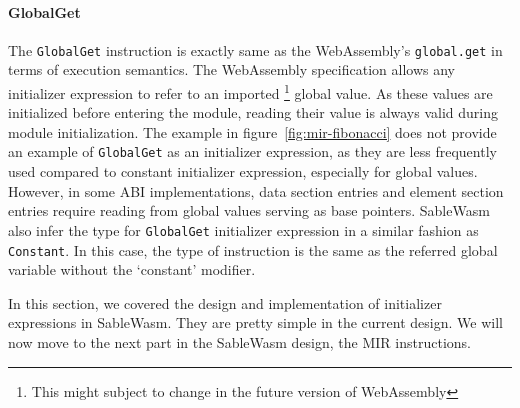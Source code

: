 \paragraph{GlobalGet}
The \texttt{GlobalGet} instruction is exactly same as the WebAssembly's
\texttt{global.get} in terms of execution semantics. The WebAssembly
specification allows any initializer expression to refer to an imported
\footnote{This might subject to change in the future version of WebAssembly}
global value. As these values are initialized before entering the module,
reading their value is always valid during module initialization. The example
in figure~\ref{fig:mir-fibonacci} does not provide an example of
\texttt{GlobalGet} as an initializer expression, as they are less frequently
used compared to constant initializer expression, especially for global values.
However, in some ABI implementations, data section entries and element section
entries require reading from global values serving as base pointers. SableWasm
also infer the type for \texttt{GlobalGet} initializer expression in a similar
fashion as \texttt{Constant}. In this case, the type of instruction is the same
as the referred global variable without the `constant' modifier.

In this section, we covered the design and implementation of initializer
expressions in SableWasm. They are pretty simple in the current design. We will
now move to the next part in the SableWasm design, the MIR instructions.